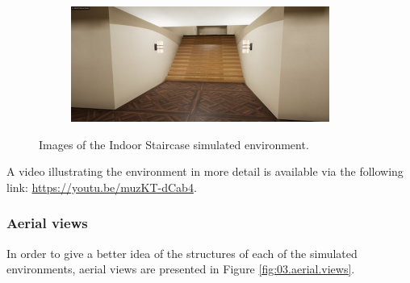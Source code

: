 \begin{figure}[H]
\begin{subfigure}[b]{0.48\textwidth}
    \end{subfigure}
    \hfill
    \begin{subfigure}[b]{0.48\textwidth}
        \centering
        \includegraphics[width=\textwidth]{resources/png/03/indoor-staircase/4.png}
    \end{subfigure}
    \caption{Images of the Indoor Staircase simulated environment.}
    \label{fig:03.indoor.staircase.images}
\end{figure}

A video illustrating the environment in more detail is available via the following link: \url{https://youtu.be/muzKT-dCab4}.

\subsubsection{Aerial views}

In order to give a better idea of the structures of each of the simulated environments, aerial views are presented in Figure \ref{fig:03.aerial.views}.

